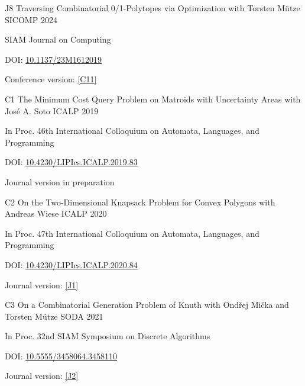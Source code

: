 \begin{cvpublication}
	{J8}
	{Traversing Combinatorial 0/1-Polytopes via Optimization}
	{with Torsten Mütze}
	{SICOMP}
	{2024}
    {
	\begin{cvitems}
	\item SIAM Journal on Computing
	\item[] DOI: \href{https://doi.org/10.1137/23M1612019}{10.1137/23M1612019}
	\item Conference version: \hyperlink{paperC11}{[C11]}
	\end{cvitems}
	}
\end{cvpublication}
\begin{cvpublication}
	{C1}
	{The Minimum Cost Query Problem on Matroids with Uncertainty Areas}
	{with José A. Soto}
	{ICALP}
	{2019}
    {
	\begin{cvitems}
	\item In Proc. 46th International Colloquium on Automata, Languages, and Programming
	\item[] DOI: \href{https://doi.org/10.4230/LIPIcs.ICALP.2019.83}{10.4230/LIPIcs.ICALP.2019.83}
	\item Journal version in preparation
	\end{cvitems}
	}
\end{cvpublication}
\begin{cvpublication}
	{C2}
	{On the Two-Dimensional Knapsack Problem for Convex Polygons}
	{with Andreas Wiese}
	{ICALP}
	{2020}
    {
	\begin{cvitems}
	\item In Proc. 47th International Colloquium on Automata, Languages, and Programming
	\item[] DOI: \href{https://doi.org/10.4230/LIPIcs.ICALP.2020.84}{10.4230/LIPIcs.ICALP.2020.84}
	\item Journal version: \hyperlink{paperC1}{[J1]}
	\end{cvitems}
	}
\end{cvpublication}
\begin{cvpublication}
	{C3}
	{On a Combinatorial Generation Problem of Knuth}
	{with Ondřej Mička and Torsten Mütze}
	{SODA}
	{2021}
    {
	\begin{cvitems}
	\item In Proc. 32nd SIAM Symposium on Discrete Algorithms
	\item[] DOI: \href{https://doi.org/10.5555/3458064.3458110}{10.5555/3458064.3458110}
	\item Journal version: \hyperlink{paperC2}{[J2]}
	\end{cvitems}
	}
\end{cvpublication}
